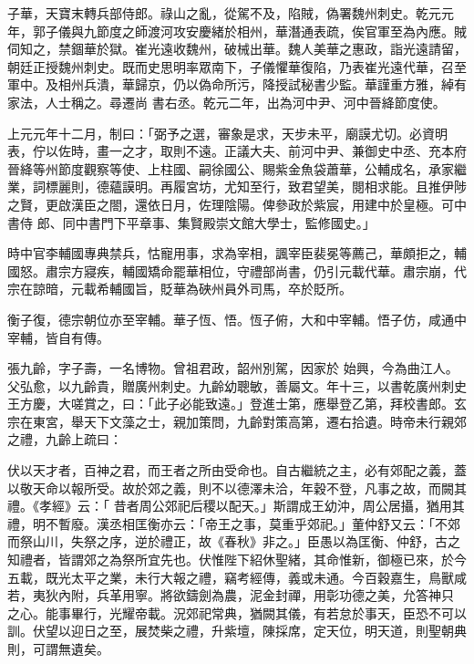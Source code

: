 \begin{pinyinscope}
 子華，天寶末轉兵部侍郎。祿山之亂，從駕不及，陷賊，偽署魏州刺史。乾元元年，郭子儀與九節度之師渡河攻安慶緒於相州，華潛通表疏，俟官軍至為內應。賊伺知之，禁錮華於獄。崔光遠收魏州，破械出華。魏人美華之惠政，詣光遠請留，朝廷正授魏州刺史。既而史思明率眾南下，子儀懼華復陷，乃表崔光遠代華，召至軍中。及相州兵潰，華歸京，仍以偽命所污，降授試秘書少監。華謹重方雅，綽有家法，人士稱之。尋遷尚
 書右丞。乾元二年，出為河中尹、河中晉絳節度使。



 上元元年十二月，制曰：「弼予之選，審象是求，天步未平，廟謨尤切。必資明表，佇以佐時，畫一之才，取則不遠。正議大夫、前河中尹、兼御史中丞、充本府晉絳等州節度觀察等使、上柱國、嗣徐國公、賜紫金魚袋蕭華，公輔成名，承家繼業，詞標麗則，德蘊謨明。再履宮坊，尤知至行，致君望美，閱相求能。且推伊陟之賢，更啟漢臣之閤，還依日月，佐理陰陽。俾參政於紫宸，用建中於皇極。可中書侍
 郎、同中書門下平章事、集賢殿崇文館大學士，監修國史。」



 時中官李輔國專典禁兵，怙寵用事，求為宰相，諷宰臣裴冕等薦己，華頗拒之，輔國怒。肅宗方寢疾，輔國矯命罷華相位，守禮部尚書，仍引元載代華。肅宗崩，代宗在諒暗，元載希輔國旨，貶華為硤州員外司馬，卒於貶所。



 衡子復，德宗朝位亦至宰輔。華子恆、悟。恆子俯，大和中宰輔。悟子仿，咸通中宰輔，皆自有傳。



 張九齡，字子壽，一名博物。曾祖君政，韶州別駕，因家於
 始興，今為曲江人。父弘愈，以九齡貴，贈廣州刺史。九齡幼聰敏，善屬文。年十三，以書乾廣州刺史王方慶，大嗟賞之，曰：「此子必能致遠。」登進士第，應舉登乙第，拜校書郎。玄宗在東宮，舉天下文藻之士，親加策問，九齡對策高第，遷右拾遺。時帝未行親郊之禮，九齡上疏曰：



 伏以天才者，百神之君，而王者之所由受命也。自古繼統之主，必有郊配之義，蓋以敬天命以報所受。故於郊之義，則不以德澤未洽，年穀不登，凡事之故，而闕其禮。《孝經》云：「
 昔者周公郊祀后稷以配天。」斯謂成王幼沖，周公居攝，猶用其禮，明不暫廢。漢丞相匡衡亦云：「帝王之事，莫重乎郊祀。」董仲舒又云：「不郊而祭山川，失祭之序，逆於禮正，故《春秋》非之。」臣愚以為匡衡、仲舒，古之知禮者，皆謂郊之為祭所宜先也。伏惟陛下紹休聖緒，其命惟新，御極已來，於今五載，既光太平之業，未行大報之禮，竊考經傳，義或未通。今百穀嘉生，鳥獸咸若，夷狄內附，兵革用寧。將欲鑄劍為農，泥金封禪，用彰功德之美，允答神只
 之心。能事畢行，光耀帝載。況郊祀常典，猶闕其儀，有若怠於事天，臣恐不可以訓。伏望以迎日之至，展焚柴之禮，升紫壇，陳採席，定天位，明天道，則聖朝典則，可謂無遺矣。




\end{pinyinscope}
